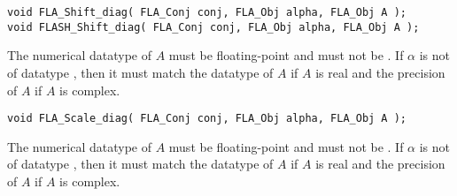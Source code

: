\begin{flaspec}
\begin{verbatim}
void FLA_Shift_diag( FLA_Conj conj, FLA_Obj alpha, FLA_Obj A );
void FLASH_Shift_diag( FLA_Conj conj, FLA_Obj alpha, FLA_Obj A );
\end{verbatim}
\begin{checks}
\checkitem
The numerical datatype of $ A $ must be floating-point and must not be
\flaconstantns.
\itemvsp
\checkitem
If $ \alpha $ is not of datatype \flaconstantns, then it must
match the datatype of $ A $ if $ A $ is real and the precision of $ A $ if
$ A $ is complex.
\end{checks}
\begin{params}
\end{params}
\end{flaspec}


\begin{flaspec}
\begin{verbatim}
void FLA_Scale_diag( FLA_Conj conj, FLA_Obj alpha, FLA_Obj A );
\end{verbatim}
\begin{checks}
\checkitem
The numerical datatype of $ A $ must be floating-point and must not be
\flaconstantns.
\itemvsp
\checkitem
If $ \alpha $ is not of datatype \flaconstantns, then it must
match the datatype of $ A $ if $ A $ is real and the precision of $ A $ if
$ A $ is complex.
\end{checks}
\begin{params}
\end{params}
\end{flaspec}


